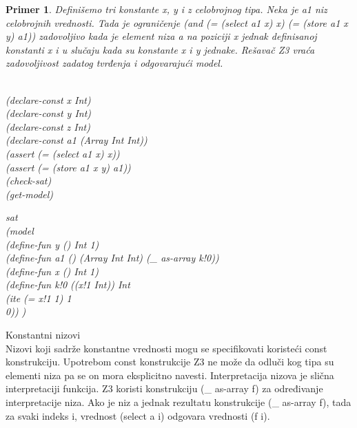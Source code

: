 \documentclass[12pt,oneside]{memoir}
\newtheorem{primer}{Primer}
\begin{document}
\begin{primer} Definišemo tri konstante x, y i z celobrojnog tipa. Neka je a1 niz celobrojnih vrednosti. Tada je ograničenje (and (= (select a1 x) x) (= (store a1 x y) a1)) zadovoljivo kada je element niza a na poziciji x jednak definisanoj konstanti x i u slučaju kada su konstante x i y jednake.
Rešavač Z3 vraća zadovoljivost zadatog tvrđenja i odgovarajući model.
 \\ \\
\begin{minipage}[b]{0.5\textwidth}
(declare-const x Int)
\\(declare-const y Int)
\\(declare-const z Int)
\\(declare-const a1 (Array Int Int))
\\(assert (= (select a1 x) x))
\\(assert (= (store a1 x y) a1))
\\(check-sat)
\\(get-model)
\end{minipage}
\hspace{1cm} 
\begin{minipage}[t]{0.5\textwidth}
\vspace{-4.5cm}
sat
\\(model 
\\(define-fun y () Int 1)
\\(define-fun a1 () (Array Int Int)
    (\_ as-array k!0))
\\(define-fun x () Int 1)
\\(define-fun k!0 ((x!1 Int)) Int
\\    (ite (= x!1 1) 1
\\      0))
)

\end{minipage}


\end{primer} 
 

Konstantni nizovi
\\

Nizovi koji sadrže konstantne vrednosti mogu se specifikovati koristeći const konstrukciju. Upotrebom const konstrukcije Z3 ne može da odluči kog tipa su elementi niza pa se on mora eksplicitno navesti. Interpretacija nizova je slična interpretaciji funkcija. Z3 koristi konstrukciju (\_ as-array f) za određivanje interpretacije niza. Ako je niz a jednak rezultatu konstrukcije (\_ as-array f), tada za svaki indeks i, vrednost (select a i) odgovara vrednosti (f i). 
\end{document}
